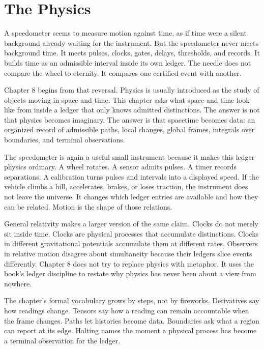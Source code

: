 \chapter{The Physics}
\label{chap:the-physics}


A speedometer seems to measure motion against time, as if time were a silent
background already waiting for the instrument. But the speedometer never meets
background time. It meets pulses, clocks, gates, delays, thresholds, and
records. It builds time as an admissible interval inside its own ledger. The
needle does not compare the wheel to eternity. It compares one certified event
with another.

Chapter 8 begins from that reversal. Physics is usually introduced as the study
of objects moving in space and time. This chapter asks what space and time look
like from inside a ledger that only knows admitted distinctions. The answer is
not that physics becomes imaginary. The answer is that spacetime becomes data:
an organized record of admissible paths, local changes, global frames,
integrals over boundaries, and terminal observations.

The speedometer is again a useful small instrument because it makes this
ledger physics ordinary. A wheel rotates. A sensor admits pulses. A timer
records separations. A calibration turns pulses and intervals into a displayed
speed. If the vehicle climbs a hill, accelerates, brakes, or loses traction,
the instrument does not leave the universe. It changes which ledger entries are
available and how they can be related. Motion is the shape of those relations.

General relativity makes a larger version of the same claim. Clocks do not
merely sit inside time. Clocks are physical processes that accumulate
distinctions. Clocks in different gravitational potentials accumulate them at
different rates. Observers in relative motion disagree about simultaneity
because their ledgers slice events differently. Chapter 8 does not try to
replace physics with metaphor. It uses the book's ledger discipline to restate
why physics has never been about a view from nowhere.

The chapter's formal vocabulary grows by steps, not by fireworks. Derivatives
say how readings change. Tensors say how a reading can remain accountable when
the frame changes. Paths let histories become data. Boundaries ask what a
region can report at its edge. Halting names the moment a physical process has
become a terminal observation for the ledger.

